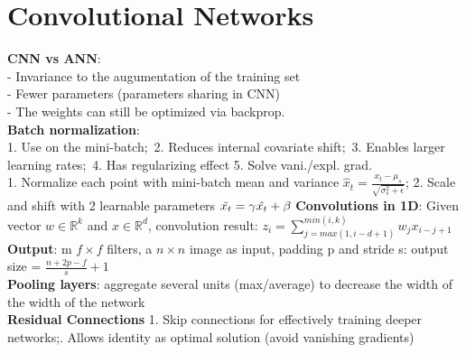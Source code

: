 \section{Convolutional Networks}
\textbf{CNN vs ANN}:\\
- Invariance to the augumentation of the training set\\
- Fewer parameters (parameters sharing in CNN)\\
- The weights can still be optimized via backprop.\\
\textbf{Batch normalization}:\\
1. Use on the mini-batch;\ 
2. Reduces internal covariate shift;\ 
3. Enables larger learning rates;\ 
4. Has regularizing effect
5. Solve vani./expl. grad.\\ 
1. Normalize each point with mini-batch mean and variance $\hat{x}_t = \frac{x_t-\mu_s}{\sqrt{\sigma_s^2+\epsilon}}$; 2. Scale and shift with 2 learnable parameters $\Tilde{x_t} = \gamma \hat{x_t} + \beta$
\textbf{Convolutions in 1D}: 
Given vector $w \in \mathbb{R}^k$ and $x \in \mathbb{R}^d$, convolution result: $z_i = \sum^{min(i,k)}_{j = max(1, i-d+1)}{w_j}x_{i-j+1}$ \\
\textbf{Output}:
m $f\times f$ filters, a $n \times n$ image as input, padding p and stride s: output size = $\frac{n+2p-f}{s}+1$\\
\textbf{Pooling layers}:
aggregate several units (max/average) to decrease the width of the width of the network\\
\textbf{Residual Connections}
1. Skip connections for effectively training deeper networks;. Allows identity as optimal solution (avoid vanishing gradients)
